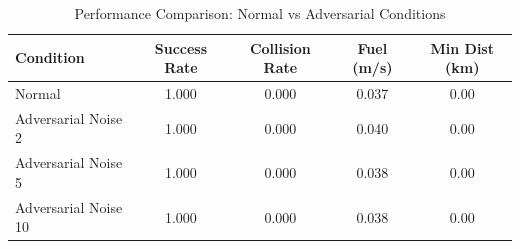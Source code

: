 
\begin{table}[h]
\centering
\caption{Performance Comparison: Normal vs Adversarial Conditions}
\label{tab:security_comparison}
\begin{tabular}{lcccc}
\toprule
\textbf{Condition} & \textbf{Success Rate} & \textbf{Collision Rate} & \textbf{Fuel (m/s)} & \textbf{Min Dist (km)} \\
\midrule
Normal & 1.000 & 0.000 & 0.037 & 0.00 \\
Adversarial Noise 2 & 1.000 & 0.000 & 0.040 & 0.00 \\
Adversarial Noise 5 & 1.000 & 0.000 & 0.038 & 0.00 \\
Adversarial Noise 10 & 1.000 & 0.000 & 0.038 & 0.00 \\
\bottomrule
\end{tabular}
\end{table}
